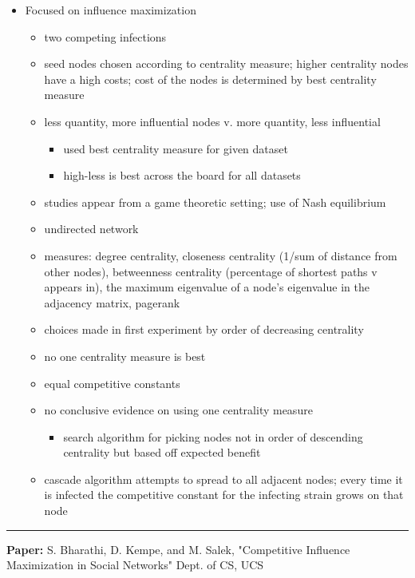 \documentclass[11pt]{article}
\begin{document}
\begin{itemize}
\item Focused on influence maximization
  \begin{itemize}
     \item two competing infections
     \item seed nodes chosen according to centrality measure; 
           higher centrality nodes have a high costs; 
           cost of the nodes is determined by best centrality measure
    \item less quantity, more influential nodes v. more quantity, less influential
        \begin{itemize}
	   \item used best centrality measure for given dataset
	   \item high-less is best across the board for all datasets
        \end{itemize}
	\item studies appear from a game theoretic setting; use of Nash equilibrium
	\item undirected network
	\item measures: degree centrality, closeness centrality
	(1/sum of distance from other nodes), betweenness centrality
	(percentage of shortest paths v appears in), the maximum
	eigenvalue of a node’s eigenvalue in the adjacency matrix,
	pagerank
	\item choices made in first experiment by order of decreasing centrality
	\item no one centrality measure is best
	\item equal competitive constants
	\item no conclusive evidence on using one centrality measure
            \begin{itemize}
		\item search algorithm for picking nodes not in
		order of descending centrality but based off expected
		benefit
            \end{itemize}
	\item cascade algorithm attempts to spread to all adjacent
	nodes; every time it is infected the competitive constant
	for the infecting strain grows on that node
   \end{itemize}
\end{itemize}

\smallskip
\rule{\textwidth}{0.01in}
\textbf{Paper:} S. Bharathi, D. Kempe, and M. Salek, "Competitive Influence Maximization in Social Networks" Dept. of CS, UCS
\end{document}
